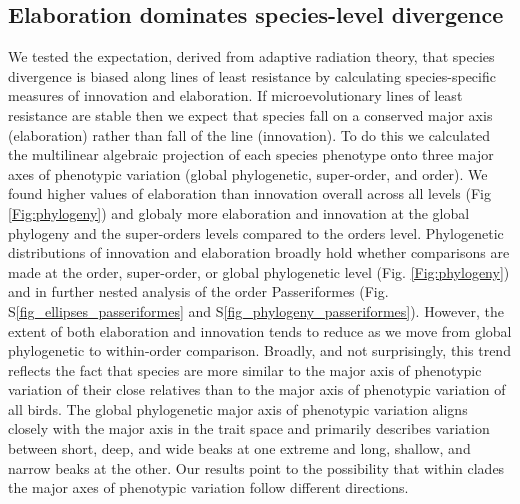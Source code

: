 \documentclass[12pt,letterpaper]{article}
\begin{document}
\subsection{Elaboration dominates species-level divergence}
We tested the expectation, derived from adaptive radiation theory, that species divergence is biased along lines of least resistance by calculating species-specific measures of innovation and elaboration.
If microevolutionary lines of least resistance are stable then we expect that species fall on a conserved major axis (elaboration) rather than fall of the line (innovation).
To do this we calculated the multilinear algebraic projection of each species phenotype onto three major axes of phenotypic variation (global phylogenetic, super-order, and order).
We found higher values of elaboration than innovation overall across all levels (Fig \ref{Fig:phylogeny}) and globaly more elaboration and innovation at the global phylogeny and the super-orders levels compared to the orders level.
Phylogenetic distributions of innovation and elaboration broadly hold whether comparisons are made at the order, super-order, or global phylogenetic level (Fig. \ref{Fig:phylogeny})%
 and in further nested analysis of the order Passeriformes (Fig. S\ref{fig_ellipses_passeriformes} and S\ref{fig_phylogeny_passeriformes}).
However, the extent of both elaboration and innovation tends to reduce as we move from global phylogenetic to within-order comparison.
Broadly, and not surprisingly, this trend reflects the fact that species are more similar to the major axis of phenotypic variation of their close relatives than to the major axis of phenotypic variation of all birds.
The global phylogenetic major axis of phenotypic variation aligns closely with the major axis in the trait space and primarily describes variation between short, deep, and wide beaks at one extreme and long, shallow, and narrow beaks at the other.
Our results point to the possibility that within clades the major axes of phenotypic variation follow different directions. 
\end{document}
